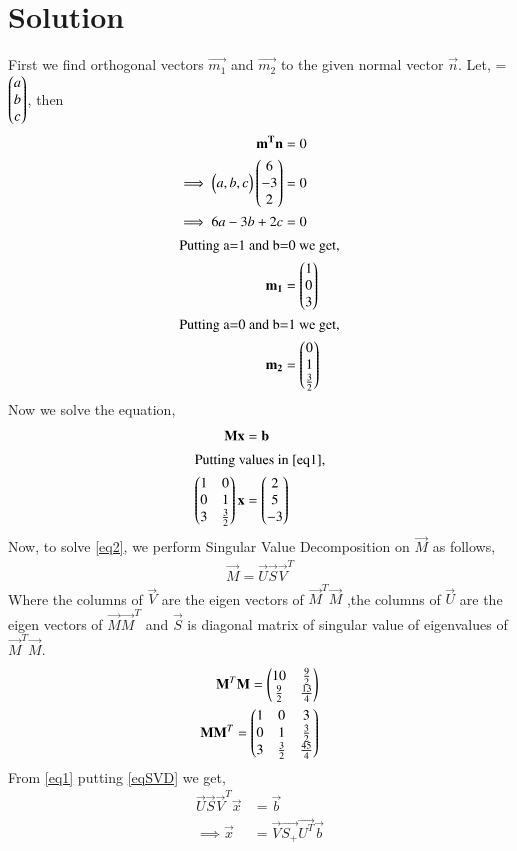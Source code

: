\documentclass[journal,12pt,twocolumn]{IEEEtran}
\begin{document}
 \section{\textbf{Solution}}
First we find orthogonal vectors $\vec{m_1}$ and $\vec{m_2}$ to the given normal vector $\vec{n}$. Let,  = $\begin{pmatrix}a\\b\\c\end{pmatrix}$, then
\begin{align}
\mathbf{m^T}\mathbf{n} &= 0\\
\implies\begin{pmatrix}a,b,c\end{pmatrix}\begin{pmatrix}6\\-3\\2\end{pmatrix} &= 0\\
\implies6a-3b+2c &= 0\\
\intertext{Putting a=1 and b=0 we get,}
\mathbf{m_1} &= \begin{pmatrix}1\\0\\3\end{pmatrix}\\
\intertext{Putting a=0 and b=1 we get,}
\mathbf{m_2} &= \begin{pmatrix}0\\1\\\frac{3}{2}\end{pmatrix}
\end{align}
Now we solve the equation,
\begin{align}
\mathbf{M}\mathbf{x} &= \mathbf{b}\label{eq1}\\
\intertext{Putting values in \eqref{eq1},}
\begin{pmatrix}1&0\\0&1\\3&\frac{3}{2}\end{pmatrix}\mathbf{x} &= \begin{pmatrix}2\\5\\-3\end{pmatrix}\label{eq2}
\end{align}
Now, to solve \eqref{eq2}, we perform Singular Value Decomposition on $\vec{M}$ as follows,
\begin{align}
\vec{M}=\vec{U}\vec{S}\vec{V}^T\label{eqSVD}
\end{align}
Where the columns of $\vec{V}$ are the eigen vectors of $\vec{M}^T\vec{M}$ ,the columns of $\vec{U}$ are the eigen vectors of $\vec{M}\vec{M}^T$ and $\vec{S}$ is diagonal matrix of singular value of eigenvalues of $\vec{M}^T\vec{M}$.
\begin{align}
\mathbf{M}^T\mathbf{M}=\begin{pmatrix}10&\frac{9}{2}\\\frac{9}{2}&\frac{13}{4}\end{pmatrix}\label{eqMTM}\\
\mathbf{M}\mathbf{M}^T=\begin{pmatrix}1&0&3\\0&1&\frac{3}{2}\\3&\frac{3}{2}&\frac{45}{4}\end{pmatrix}
\end{align}
From \eqref{eq1} putting \eqref{eqSVD} we get,
\begin{align}
\vec{U}\vec{S}\vec{V}^T\vec{x} & = \vec{b}\\
\implies\vec{x} &= \vec{V}\vec{S_+}\vec{U^T}\vec{b}\label{eqX}\label{eqX}
\end{align}
\end{document}
